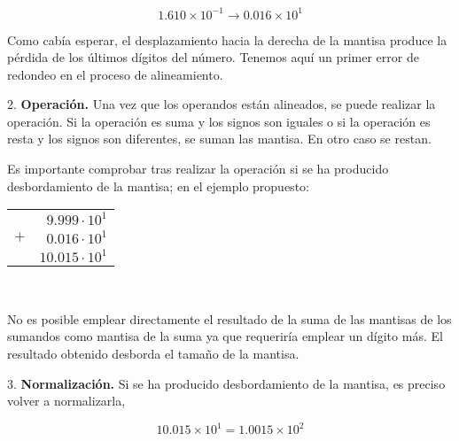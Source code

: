 \begin{equation*}
1.610\times 10^{-1}\rightarrow 0.016\times10^1
\end{equation*}
\begin{paracol}{2}
Como cabía esperar, el desplazamiento hacia la derecha de la mantisa produce la pérdida de los últimos dígitos del número. Tenemos aquí un primer error de redondeo en el proceso de alineamiento.

2. \textbf{Operación.}
Una vez que los operandos están alineados, se puede realizar la operación. Si la operación es suma y los signos son iguales o si la operación es resta y los signos son diferentes, se suman las mantisa. En otro caso se restan.

Es importante comprobar tras realizar la operación si se ha producido desbordamiento de la mantisa; en el ejemplo propuesto:
\end{paracol}
\begin{tabular}{c r}
&$9.999\cdot10^1$\\
$+$&$0.016\cdot10^1$\\
\hline
&$10.015\cdot10^1$
\end{tabular}\\
\begin{paracol}{2}
No es posible emplear directamente el resultado de la suma de las mantisas de los sumandos como mantisa de la suma ya que requeriría emplear un dígito más. El resultado obtenido desborda el tamaño de la mantisa.

3. \textbf{Normalización.}
Si se ha producido desbordamiento de la mantisa, es preciso volver a normalizarla,
\end{paracol}

\begin{equation*}
10.015\times10^1=1.0015\times10^2
\end{equation*}

